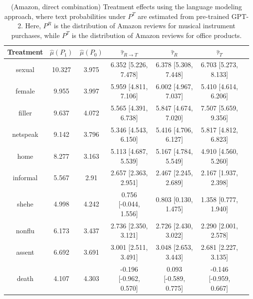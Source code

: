 \documentclass{article}
\begin{document}
\begin{table}[!ht]
    \centering
    \begin{tabular}{c|cccccc}
\toprule
      Treatment &   $\hat{\mu}(P_1)$ &   $\hat{\mu}(P_0)$ & $\hat{\tau}_{R \rightarrow T}$   & $\hat{\tau}_R$       & $\hat{\tau}_T$       \\
\midrule
 sexual      &             10.327 &              3.975 & 6.352 [5.226, 7.478]             & 6.378 [5.308, 7.448]  & 6.703 [5.273, 8.133]   \\
 female      &              9.955 &              3.997 & 5.959 [4.811, 7.106]             & 6.002 [4.967, 7.037]  & 5.410 [4.614, 6.206]   \\
 filler      &              9.637 &              4.072 & 5.565 [4.391, 6.738]             & 5.847 [4.674, 7.020]  & 7.507 [5.659, 9.356]   \\
 netspeak    &              9.142 &              3.796 & 5.346 [4.543, 6.150]             & 5.416 [4.706, 6.127]  & 5.817 [4.812, 6.823]   \\
 home        &              8.277 &              3.163 & 5.113 [4.687, 5.539]             & 5.167 [4.784, 5.549]  & 4.910 [4.560, 5.260]   \\
 informal    &              5.567 &              2.91  & 2.657 [2.363, 2.951]             & 2.467 [2.245, 2.689]  & 2.167 [1.937, 2.398]   \\
 shehe       &              4.998 &              4.242 & 0.756 [-0.044, 1.556]            & 0.803 [0.130, 1.475]  & 1.358 [0.777, 1.940]   \\
 nonflu      &              6.173 &              3.437 & 2.736 [2.350, 3.121]             & 2.726 [2.430, 3.022]  & 2.290 [2.001, 2.578]   \\
 assent      &              6.692 &              3.691 & 3.001 [2.511, 3.491]             & 3.048 [2.653, 3.443]  & 2.681 [2.227, 3.135]   \\
 death       &              4.107 &              4.303 & -0.196 [-0.962, 0.570]           & 0.093 [-0.589, 0.775] & -0.146 [-0.959, 0.667] \\
\bottomrule
    \end{tabular}
    \caption{(Amazon, direct combination) Treatment effects using the language modeling approach, where text probabilities under $P^T$ are estimated from pre-trained GPT-2. Here, $P^R$ is the distribution of Amazon reviews for musical instrument purchases, while $P^T$ is the distribution of Amazon reviews for office products.}
    \label{tab:results_clm_gpt2_amazon_synthetic}
\end{table}
\end{document}
